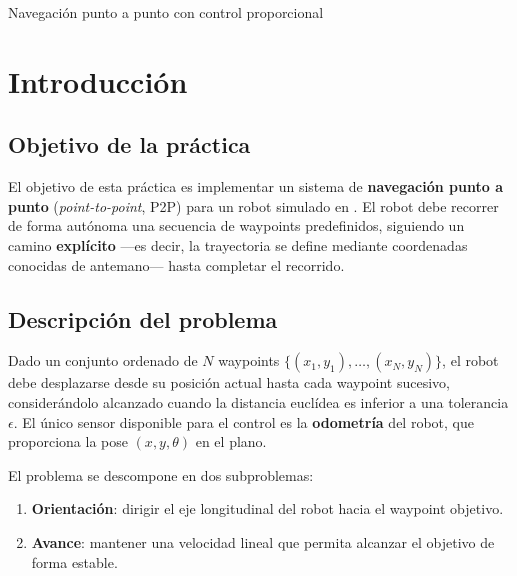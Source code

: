 \documentclass[12pt]{article}
\begin{document}
%
        {Navegaci\'{o}n punto a punto con control proporcional}

\tableofcontents
\clearpage


\section{Introducci\'{o}n}

\subsection{Objetivo de la pr\'{a}ctica}
El objetivo de esta pr\'{a}ctica es implementar un sistema de \textbf{navegaci\'{o}n punto a punto} (\emph{point-to-point}, P2P) para un robot \pioneer{} simulado en \coppelia{}. El robot debe recorrer de forma aut\'{o}noma una secuencia de waypoints predefinidos, siguiendo un camino \textbf{expl\'{i}cito} ---es decir, la trayectoria se define mediante coordenadas conocidas de antemano--- hasta completar el recorrido.

\subsection{Descripci\'{o}n del problema}
Dado un conjunto ordenado de $N$ waypoints $\{(x_1, y_1),\dots,(x_N, y_N)\}$, el robot debe desplazarse desde su posici\'{o}n actual hasta cada waypoint sucesivo, consider\'{a}ndolo alcanzado cuando la distancia eucl\'{i}dea es inferior a una tolerancia $\epsilon$. El \'{u}nico sensor disponible para el control es la \textbf{odometr\'{i}a} del robot, que proporciona la pose $(x, y, \theta)$ en el plano.

El problema se descompone en dos subproblemas:
\begin{enumerate}[leftmargin=2em]
  \item \textbf{Orientaci\'{o}n}: dirigir el eje longitudinal del robot hacia el waypoint objetivo.
  \item \textbf{Avance}: mantener una velocidad lineal que permita alcanzar el objetivo de forma estable.
\end{enumerate}


\end{document}
